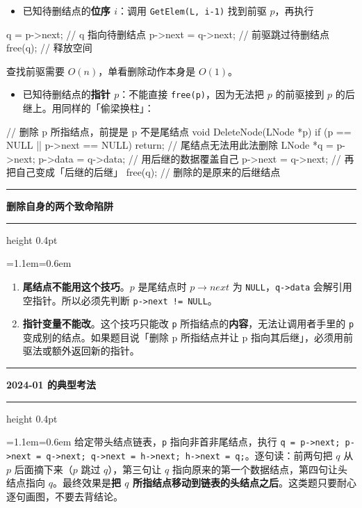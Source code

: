 \documentclass[11pt,openany,UTF8]{ctexbook}
\newcommand{\callouthead}[2]{%
  \par\addvspace{7pt}\noindent
  {\color{#1}\rule[-0.15em]{3pt}{1.05em}}\hspace{0.5em}%
  {\bfseries\color{#1}#2}\par\nobreak\vspace{-0.35em}%
  {\color{rulesep}\hrule height 0.4pt}\nobreak\vspace{0.45em}%
  \begingroup\small\setlength{\parindent}{0pt}%
  \leftskip=1.1em\rightskip=0.6em\noindent\ignorespaces}
\newcommand{\calloutend}{\par\endgroup\addvspace{7pt}}
\newenvironment{callwarn}[1]{\callouthead{warnbar}{#1}}{\calloutend}
\newenvironment{callexam}[1]{\callouthead{exambar}{#1}}{\calloutend}
\begin{document}
\begin{itemize}
\item 已知待删结点的\textbf{位序 $i$}：调用 \texttt{GetElem(L,\allowbreak{} i-1)\allowbreak{}} 找到前驱 $p$，再执行
\end{itemize}
\begin{codebox}
q = p->next;            // q 指向待删结点
p->next = q->next;      // 前驱跳过待删结点
free(q);                // 释放空间
\end{codebox}

查找前驱需要 $O(n)$，单看删除动作本身是 $O(1)$。

\begin{itemize}
\item 已知待删结点的\textbf{指针 $p$}：不能直接 \texttt{free(p)\allowbreak{}}，因为无法把 $p$ 的前驱接到 $p$ 的后继上。用同样的「偷梁换柱」：
\end{itemize}
\begin{codebox}
// 删除 p 所指结点，前提是 p 不是尾结点
void DeleteNode(LNode *p) {
    if (p == NULL || p->next == NULL) return;   // 尾结点无法用此法删除
    LNode *q = p->next;
    p->data = q->data;      // 用后继的数据覆盖自己
    p->next = q->next;      // 再把自己变成「后继的后继」
    free(q);                // 删除的是原来的后继结点
}
\end{codebox}

\begin{callwarn}{删除自身的两个致命陷阱}
\begin{enumerate}
\item \textbf{尾结点不能用这个技巧}。$p$ 是尾结点时 $p\to next$ 为 \texttt{NULL}，\texttt{q->\allowbreak{}data} 会解引用空指针。所以必须先判断 \texttt{p->\allowbreak{}next !=\allowbreak{} NULL}。
\item \textbf{指针变量不能改}。这个技巧只能改 \texttt{p} 所指结点的\textbf{内容}，无法让调用者手里的 \texttt{p} 变成别的结点。如果题目说「删除 p 所指结点并让 p 指向其后继」，必须用前驱法或额外返回新的指针。
\end{enumerate}
\end{callwarn}

\begin{callexam}{2024-01 的典型考法}
给定带头结点链表，\texttt{p} 指向非首非尾结点，执行 \texttt{q =\allowbreak{} p->\allowbreak{}next;\allowbreak{} p->\allowbreak{}next =\allowbreak{} q->\allowbreak{}next;\allowbreak{} q->\allowbreak{}next =\allowbreak{} h->\allowbreak{}next;\allowbreak{} h->\allowbreak{}next =\allowbreak{} q;\allowbreak{}}。逐句读：前两句把 $q$ 从 $p$ 后面摘下来（$p$ 跳过 $q$），第三句让 $q$ 指向原来的第一个数据结点，第四句让头结点指向 $q$。最终效果是\textbf{把 $q$ 所指结点移动到链表的头结点之后}。这类题只要耐心逐句画图，不要去背结论。

\end{callexam}
\end{document}
